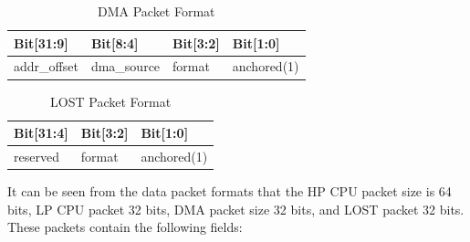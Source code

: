 \documentclass[main\_\_EN.tex]{subfiles}
\begin{document}
    \begin{longtable}[c]{|L{3cm}|L{2cm}|L{2cm}|l|}
    \caption{DMA Packet Format}\label{tab:dma_package}
    \\\hline
    {\bfseries Bit[31:9]} & {\bfseries Bit[8:4]} & {\bfseries Bit[3:2]} & {\bfseries Bit[1:0]} \\\hline
     addr\_offset & dma\_source & format & anchored(1)  \\\hline
    \end{longtable}
    
    \begin{longtable}[c]{|L{3cm}|L{3cm}|l|}
    \caption{LOST Packet Format}\label{tab:lost_package}
    \\\hline
    {\bfseries Bit[31:4]} & {\bfseries Bit[3:2]} & {\bfseries Bit[1:0]} \\\hline
    reserved & format & anchored(1) \\\hline
    \end{longtable}

It can be seen from the data packet formats that the HP CPU packet size is 64 bits, LP CPU packet 32 bits, DMA packet size 32 bits, and LOST packet 32 bits. These packets contain the following fields:
\end{document}
